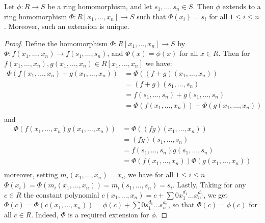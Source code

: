 \begin{theorem}\label{theorem_7.1.6}
  Let $\phi:R \xrightarrow{} S$ be a ring homomorphism, and let $s_1,
  \dots, s_n \in S$. Then $\phi$ extends to a ring homomorphism
  $\Phi:R[x_1, \dots, x_n] \xrightarrow{} S$ such that $\Phi(x_i)=s_i$
  for all $1 \leq i \leq n$. Moreover, such an extension is unique.
\end{theorem}
\begin{proof}
  Define the homomorphism $\Phi:R[x_1, \dots, x_n] \xrightarrow{} S$
  by $\Phi:f(x_1, \dots, x_n) \xrightarrow{} f(s_1, \dots, s_n)$, and
  $\Phi(x)=\phi(x)$ for all $x \in R$. Then for $f(x_1, \dots, x_n),
  g(x_1, \dots, x_n) \in R[x_1, \dots, x_n]$ we have:
  \begin{align*}
    \Phi(f(x_1, \dots, x_n)+g(x_1, \dots, x_n)) &= \Phi((f+g)(x_1, \dots, x_n)) \\
                                                &= (f+g)(s_1, \dots, s_n) \\
                                                &= f(s_1, \dots, s_n)+g(s_1, \dots, s_n) \\
                                                &= \Phi(f(x_1, \dots, x_n))+\Phi(g(x_1, \dots, x_n)) \\
  \end{align*}
  and
  \begin{align*}
    \Phi(f(x_1, \dots, x_n)g(x_1, \dots, x_n)) &= \Phi((fg)(x_1, \dots, x_n)) \\
                                               &= (fg)(s_1, \dots, s_n) \\
                                               &= f(s_1, \dots, s_n)g(s_1, \dots, s_n) \\
                                               &= \Phi(f(x_1, \dots, x_n))\Phi(g(x_1, \dots, x_n)) \\
  \end{align*}
  moreover, setting $m_i(x_1, \dots, x_n)=x_i$, we have for all $1
  \leq i \leq n$ $\Phi(x_i)=\Phi(m_i(x_1, \dots, x_n))=m_i(s_1, \dots,
  s_n)=s_i$. Lastly, Taking for any $c \in R$ the constant
  polynomial $c(x_1, \dots, x_n)=c+\sum{0x_1^{d_1} \dots x_n^{d_n}}$,
  we get $\Phi(c)=\Phi(c(x_1 ,\dots, x_n))=\phi(c)+\sum{0s_1^{d_1}
  \dots s_n^{d_n}}$, so that $\Phi(c)=\phi(c)$ for all $c \in R$.
  Indeed, $\Phi$ is a required extension for $\phi$.


\end{proof}
